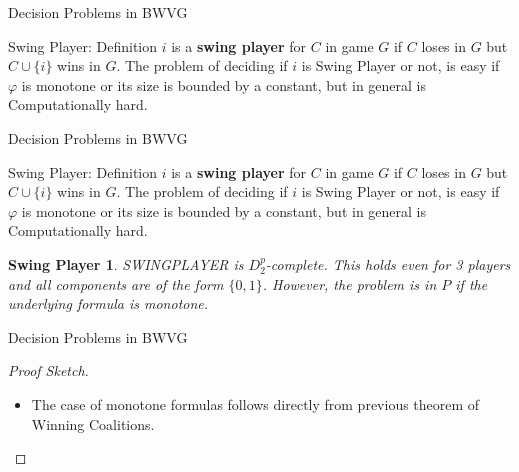 \documentclass{beamer}
\begin{document}
\begin{frame}[fragile]{Decision Problems in BWVG}
  \newtheorem{theorem4}{Swing Player}
  \begin{block}{Swing Player: Definition}
    $i$ is a \textbf{swing player} for $C$ in game $G$ if $C$ loses in $G$ but $C \cup \{i\}$ wins in $G$.\newline
    The problem of deciding if $i$ is Swing Player or not, is easy if $\varphi$ is monotone or its size is bounded by a constant, but in general is
    Computationally hard.
  \end{block}
\end{frame}


\begin{frame}[fragile]{Decision Problems in BWVG}
  \begin{block}{Swing Player: Definition}
    $i$ is a \textbf{swing player} for $C$ in game $G$ if $C$ loses in $G$ but $C \cup \{i\}$ wins in $G$.\newline
    The problem of deciding if $i$ is Swing Player or not, is easy if $\varphi$ is monotone or its size is bounded by a constant, but in general is
    Computationally hard.
  \end{block}
  \begin{theorem4}
    SWINGPLAYER is $D_2^p$-complete. This holds even for 3 players and all components are of the form $\{0,1\}$. However, the problem is in $P$ if the underlying
    formula is monotone.
  \end{theorem4}
\end{frame}

\begin{frame}[fragile]{Decision Problems in BWVG}
  \begin{proof}[Proof Sketch]
    \begin{itemize}
      \item The case of monotone formulas follows directly from previous theorem of Winning Coalitions.
    \end{itemize}
  \end{proof}
\end{frame}
\end{document}
